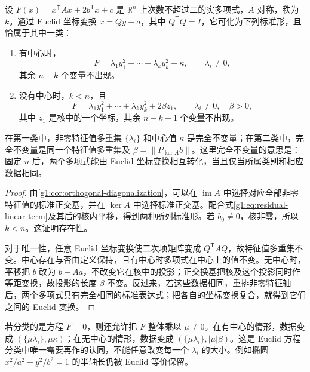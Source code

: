 \begin{theorem}
	\label{g1:thm:euclidean-quadric-normal}
	设 \(F(x)=x^{\mathsf T}Ax+2b^{\mathsf T}x+c\) 是 \(\mathbb R^n\) 上次数不超过二的实多项式，\(A\) 对称，秩为 \(k\)。通过 Euclid 坐标变换 \(x=Qy+a\)，其中 \(Q^{\mathsf T}Q=I\)，它可化为下列标准形，且恰属于其中一类：
	\begin{enumerate}
		\item 有中心时，
		\[
			F=\lambda_1y_1^2+\cdots+\lambda_ky_k^2+\kappa,
			\qquad \lambda_i\ne0,
		\]
		其余 \(n-k\) 个变量不出现。
		\item 没有中心时，\(k<n\)，且
		\[
			F=\lambda_1y_1^2+\cdots+\lambda_ky_k^2+2\beta z_1,
			\qquad \lambda_i\ne0,\quad\beta>0,
		\]
		其中 \(z_1\) 是核中的一个坐标，其余 \(n-k-1\) 个变量不出现。
	\end{enumerate}
	在第一类中，非零特征值多重集 \(\{\lambda_i\}\) 和中心值 \(\kappa\) 是完全不变量；在第二类中，完全不变量是同一个特征值多重集及 \(\beta=\lVert P_{\ker A}b\rVert\)。这里完全不变量的意思是：固定 \(n\) 后，两个多项式能由 Euclid 坐标变换相互转化，当且仅当所属类别和相应数据相同。
\end{theorem}

\begin{proof}
	由\cref{g1:cor:orthogonal-diagonalization}，可以在 \(\operatorname{im}A\) 中选择对应全部非零特征值的标准正交基，并在 \(\ker A\) 中选择标准正交基。配合式\eqref{g1:eq:residual-linear-term}及其后的核内平移，得到两种所列标准形。若 \(b_0\ne0\)，核非零，所以 \(k<n\)。这证明存在性。

	对于唯一性，任意 Euclid 坐标变换使二次项矩阵变成 \(Q^{\mathsf T}AQ\)，故特征值多重集不变。中心存在与否由定义保持，且有中心时多项式在中心上的值不变。无中心时，平移把 \(b\) 改为 \(b+Aa\)，不改变它在核中的投影；正交换基把核及这个投影同时作等距变换，故投影的长度 \(\beta\) 不变。反过来，若这些数据相同，重排非零特征轴后，两个多项式具有完全相同的标准表达式；把各自的坐标变换复合，就得到它们之间的 Euclid 变换。
\end{proof}

若分类的是方程 \(F=0\)，则还允许把 \(F\) 整体乘以 \(\mu\ne0\)。在有中心的情形，数据变成 \((\{\mu\lambda_i\},\mu\kappa)\)；在无中心的情形，数据变成 \((\{\mu\lambda_i\},|\mu|\beta)\)。这是 Euclid 方程分类中唯一需要再作的认同，不能任意改变每一个 \(\lambda_i\) 的大小。例如椭圆 \(x^2/a^2+y^2/b^2=1\) 的半轴长仍被 Euclid 等价保留。

